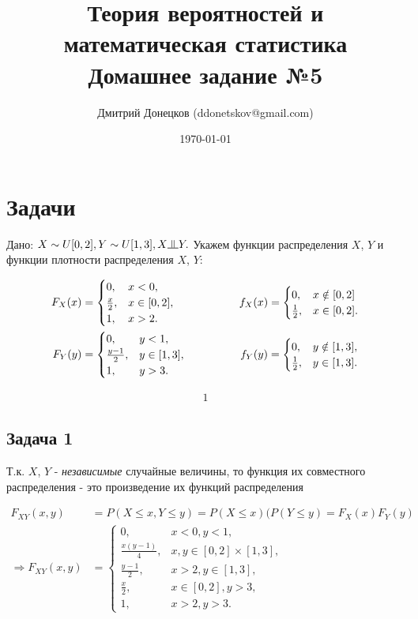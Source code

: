 \documentclass[a4paper,11pt]{article}
\title{\vspace{-1.5cm}Теория вероятностей и математическая статистика \\
Домашнее задание №5}
\author{Дмитрий Донецков (ddonetskov@gmail.com)}
\date{\today}
\newcommand{\independent}{\raisebox{0.05em}{\rotatebox[origin=c]{90}{$\models$}}}
\begin{document}
\maketitle

\section{Задачи}

Дано: $X \sim U[0,2], Y \sim U[1,3], X \independent Y.$ Укажем функции распределения $X$, $Y$ и функции плотности распределения $X$, $Y$:

\begin{align*}
F_X(x) & = 
\begin{cases}
  0,   & x < 0, \\
  \frac{x}{2}, & x \in [0,2], \\
  1,   & x > 2.
\end{cases}
\hspace{2cm}
f_X(x) = 
\begin{cases}
0, & x \notin [0,2] \\
\frac{1}{2}, & x \in [0,2].
\end{cases}
\\
F_Y(y) & = 
\begin{cases}
0,   & y < 1, \\
\frac{y-1}{2}, & y \in [1,3], \\
1,   & y > 3.
\end{cases}
\hspace{1.7cm}
f_Y(y) = 
\begin{cases}
0,   & y \notin [1,3], \\
\frac{1}{2}, & y \in [1,3].
\end{cases}
\end{align*}

\begin{align*}
1
\end{align*}

\subsection{Задача 1}

Т.к. $X$, $Y$ - \textit{независимые} случайные величины, то функция их совместного распределения - это произведение их функций распределения 

\begin{align*}
F_{XY}(x, y) & = P(X \leq x, Y \leq y) = P(X \leq x) (P(Y \leq y) = F_X(x) F_Y(y) \\
\Rightarrow
F_{XY}(x, y) & =
\begin{cases}
  0, & x < 0, y < 1, \\
  \frac{x(y-1)}{4}, & x, y \in [0,2]\times[1,3], \\
  \frac{y-1}{2}, & x > 2, y \in [1, 3], \\
  \frac{x}{2}, & x \in [0,2], y > 3, \\
  1, & x > 2, y > 3.
\end{cases}
\end{align*}
\end{document}
